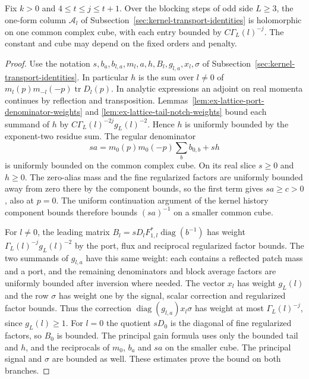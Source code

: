 \begin{lemma}
\label{lem:ex-lattice-primal-entrywise-bound}
Fix $k>0$ and $4\le t\le j\le t+1$. Over the blocking steps of odd side
$L\ge3$, the one-form column $\mathcal A_l$ of
Subsection~\ref{sec:kernel-transport-identities} is holomorphic on one common
complex cube, with each entry bounded by $C\Gamma_L(l)^{-j}$.
The constant and cube may depend on the fixed orders and penalty.
\end{lemma}

\begin{proof}
Use the notation $s,b_a,b_{l,a},m_l,a,h,B_l,g_{l,a},x_l,\sigma$
of Subsection~\ref{sec:kernel-transport-identities}. In particular $h$
is the sum over $l\ne0$ of $m_l(p)m_{-l}(-p)\operatorname{tr}D_l(p)$.
In analytic expressions an adjoint on real momenta continues by
reflection and transposition. Lemmas~\ref{lem:ex-lattice-port-denominator-weights}
and \ref{lem:ex-lattice-tail-notch-weights} bound each summand of $h$
by $C\Gamma_L(l)^{-2j}g_L(l)^{-2}$. Hence $h$ is uniformly bounded
by the exponent-two residue sum. The regular denominator
\[
 sa=m_0(p)m_0(-p)\sum_b b_{0,b}+sh
\]
is uniformly bounded on the common complex cube. On its real slice
$s\ge0$ and $h\ge0$. The zero-alias mass and the fine regularized factors are uniformly
bounded away from zero there by the component bounds, so the first
term gives $sa\ge c>0$, also at $p=0$. The uniform continuation
argument of the kernel history component bounds therefore bounds $(sa)^{-1}$
on a smaller common cube.

For $l\ne0$, the leading matrix $B_l=sD_l F_{1,l}^*\operatorname{diag}(b^{-1})$
has weight $\Gamma_L(l)^{-j}g_L(l)^{-2}$ by the port, flux and
reciprocal regularized factor bounds. The two summands of $g_{l,a}$ have this same
weight: each contains a reflected patch mass and a port, and the
remaining denominators and block average factors are uniformly bounded after
inversion where needed. The vector $x_l$ has weight $g_L(l)$ and the
row $\sigma$ has weight one by the signal, scalar correction and regularized factor bounds.
Thus the correction $\operatorname{diag}(g_{l,a})x_l\sigma$ has
weight at most $\Gamma_L(l)^{-j}$, since $g_L(l)\ge1$.
For $l=0$ the quotient $sD_0$ is the diagonal of fine regularized factors, so
$B_0$ is bounded. The principal gain formula uses only the bounded
tail and $h$, and the reciprocals of $m_0$, $b_a$ and $sa$ on the
smaller cube. The principal signal and $\sigma$ are bounded as well.
These estimates prove the bound on both branches.
\end{proof}


